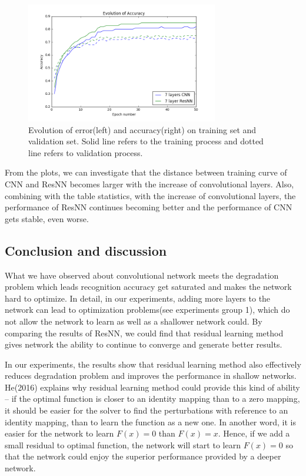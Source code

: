 \documentclass[]{article}
\begin{document}
\begin{figure}[!h]
\begin{center}
\includegraphics[width = 3.3in]{res_7layers_acc}
\caption{Evolution of error(left) and accuracy(right) on training set and validation set. Solid line refers to the training process and dotted line refers to validation process.}
\end{center}
\end{figure}

From the plots, we can investigate that the distance between training curve of CNN and ResNN becomes larger with the increase of convolutional layers. Also, combining with the table statistics, with the increase of convolutional layers, the performance of ResNN continues becoming better and the performance of CNN gets stable, even worse.  

\subsection{Conclusion and discussion} 

What we have observed about convolutional network meets the degradation problem which leads recognition accuracy get saturated and makes the network hard to optimize. In detail, in our experiments, adding more layers to the network can lead to optimization problems(see experiments group 1), which do not allow the network to learn as well as a shallower network could. By comparing the results of ResNN, we could find that residual learning method gives network the ability to continue to converge and generate better results.

In our experiments, the results show that residual learning method also effectively reduces degradation problem and improves the performance in shallow networks. He(2016) explains why residual learning method could provide this kind of ability -- if the optimal function is closer to an identity mapping than to a zero mapping, it should be easier for the solver to find the perturbations with reference to an identity mapping, than to learn the function as a new one. In another word, it is easier for the network to learn $F(x) = 0$ than $F(x) = x$. Hence, if we add a small residual to optimal function, the network will start to learn $F(x) = 0$ so that the network could enjoy the superior performance provided by a deeper network.
\end{document}
